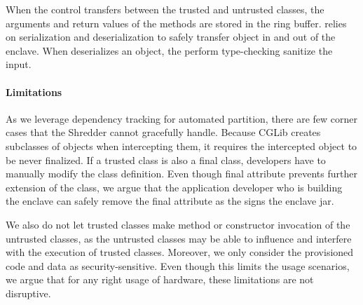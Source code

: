 When the control transfers between the trusted and untrusted classes,
the arguments and return values of the methods
are stored in the ring buffer.
\sysname{} relies on serialization and deserialization to safely transfer object in and out of the enclave.
When \sysname{} deserializes an object, the \jvm{} perform type-checking sanitize the input. %



\paragraph{Limitations}
As we leverage dependency tracking for automated partition, there are few corner cases that the Shredder cannot gracefully handle.
Because CGLib creates subclasses of objects when intercepting them,
it requires the intercepted object to be never finalized.
If a trusted class is also a final class, developers have to manually modify the class definition. Even though final attribute prevents further extension of the class, we argue that the application developer who is building the enclave can safely remove the final attribute as the \sysname{} signs the enclave jar.

 We also do not let trusted classes make method or constructor invocation of the untrusted classes, as the untrusted classes may be able to influence and interfere with the execution of trusted classes. Moreover, we only consider the provisioned code and data as security-sensitive. Even though this limits the usage scenarios, we argue that for any right usage of \sgx{} hardware, these limitations are not disruptive.

